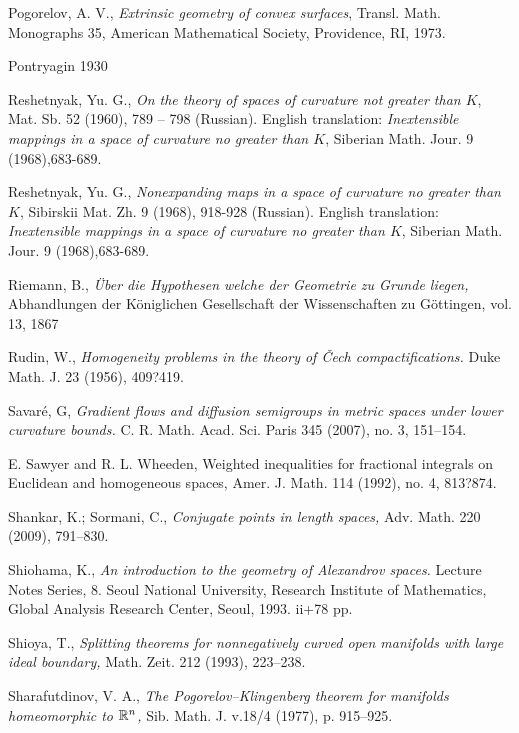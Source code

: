 \begin{thebibliography}{52}
  Pogorelov, A. V., 
\textit{Extrinsic geometry of convex surfaces}, 
Transl. Math. Monographs 35, 
American Mathematical Society, Providence, RI, 1973.


 Pontryagin 1930

Reshetnyak, Yu. G.,
\textit{On the theory of spaces of curvature not greater than $K$},
 Mat. Sb. 52 (1960), 789 -- 798 (Russian).
English translation: \textit{Inextensible mappings in a space of curvature
no greater than $K$}, Siberian Math. Jour. 9 (1968),683-689.

Reshetnyak, Yu. G.,
\textit{Nonexpanding maps in a space of curvature no greater than $K$},
Sibirskii Mat. Zh. 9 (1968), 918-928 (Russian).
English translation: \textit{Inextensible mappings in a space of curvature
no greater than $K$}, Siberian Math. Jour. 9 (1968),683-689.


 Riemann, B., \textit{\"Uber die Hypothesen welche der Geometrie zu Grunde liegen,}
Abhandlungen der K\"oniglichen Gesellschaft der Wissenschaften zu G\"ottingen, vol. 13, 1867

Rudin, W.,
\textit{Homogeneity problems in the theory of \v{C}ech compactifications.}
Duke Math. J. 23 (1956), 409?419. 

Savar\'e, G, \textit{Gradient flows and diffusion semigroups in metric spaces under lower curvature bounds.}  C. R. Math. Acad. Sci. Paris  345  (2007),  no. 3, 151--154. 

 E. Sawyer and R. L. Wheeden, Weighted inequalities for fractional integrals on Euclidean and homogeneous spaces, Amer. J. Math. 114 (1992), no. 4, 813?874.

Shankar, K.; Sormani, C., \textit{Conjugate points in length spaces,} 
Adv. Math. 220 (2009), 791--830.

Shiohama, K., \textit{An introduction to the geometry of
Alexandrov spaces.} Lecture Notes Series, 8. Seoul National University, Research
Institute of Mathematics, Global Analysis Research Center, Seoul, 1993. ii+78
pp.

  Shioya, T., \textit{Splitting theorems for nonnegatively curved open manifolds with large ideal boundary,} Math. Zeit. 212 (1993), 223--238.

Sharafutdinov, V. A., 
\textit{The Pogorelov--Klingenberg theorem for manifolds homeomorphic to $\mathbb{R}^n$,} 
Sib. Math. J. v.18/4 (1977), p. 915--925.


\end{thebibliography}
